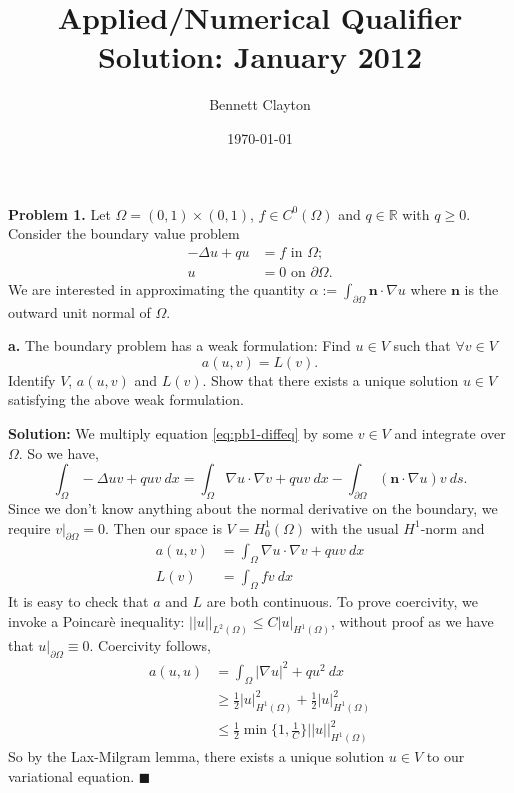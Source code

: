 \documentclass[11pt]{article}
\title{Applied/Numerical Qualifier Solution: January 2012}
\author{Bennett Clayton}
\affil{Texas A\&M University}
\date{\today}
\begin{document}
\maketitle

\textbf{Problem 1.} Let $\Omega = (0,1) \times (0,1)$, $f \in C^0(\Omega)$ and $q \in \mathbb{R}$ with $q \geq 0$.
Consider the boundary value problem
\begin{align}
    -\Delta u + qu &= f \text{ in } \Omega; \label{eq:pb1-diffeq} \\
    u &= 0 \text{ on } \partial \Omega.
\end{align}
We are interested in approximating the quantity $\alpha := \int_{\partial \Omega} \mathbf{n} \cdot \nabla u$ where $\mathbf{n}$ is the outward unit normal of $\Omega$.

\vskip 1cm

\textbf{a.} The boundary problem has a weak formulation: Find $u \in V$ such that
$\forall v \in V$ 
\begin{equation}
    a(u,v) = L(v).
\end{equation}
Identify $V$, $a(u, v)$ and $L(v)$. 
Show that there exists a unique solution $u \in V$ satisfying the
above weak formulation.

\vskip 1cm

\textbf{Solution:} We multiply equation \eqref{eq:pb1-diffeq} by some $v \in V$ and integrate over $\Omega$.
So we have,
\begin{equation*}
    \int_{\Omega} -\Delta u v + quv \: dx = \int_\Omega \nabla u \cdot \nabla v + quv \: dx - \int_{\partial \Omega} (\mathbf{n}\cdot \nabla u) v \: ds. 
\end{equation*}
Since we don't know anything about the normal derivative on the boundary, we require $v|_{\partial \Omega} = 0$.
Then our space is $V = H^1_0(\Omega)$ with the usual $H^1$-norm and
\begin{align*}
    a(u,v) &= \int_\Omega \nabla u \cdot \nabla v + quv \: dx \\
    L(v) &= \int_\Omega f v \: dx
\end{align*}
It is easy to check that $a$ and $L$ are both continuous.
To prove coercivity, we invoke a Poincar\`{e} inequality: $||u||_{L^2(\Omega)} \leq C |u|_{H^1(\Omega)}$, without proof as we have that $u|_{\partial\Omega} \equiv 0$.
Coercivity follows,
\begin{align*}
	a(u,u) &= \int_{\Omega} |\nabla u |^2 + qu^2 \: dx \\
		&\geq \tfrac12 |u|^2_{H^1(\Omega)} + \tfrac12 |u|^2_{H^1(\Omega)} \\
		&\leq \tfrac12 \min\{1, \tfrac{1}{C}\} ||u||^2_{H^1(\Omega)}
\end{align*}
So by the Lax-Milgram lemma, there exists a unique solution $u\in V$ to our variational equation.
$\blacksquare$
\end{document}
